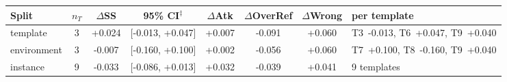 \begin{tabular}{lccccccl}
\toprule
Split & $n_T$ & $\Delta$SS & 95\% CI$^\ddagger$ & $\Delta$Atk & $\Delta$OverRef & $\Delta$Wrong & per template \\
\midrule
template & 3 & +0.024 & [-0.013, +0.047] & +0.007 & -0.091 & +0.060 & T3~-0.013, T6~+0.047, T9~+0.040 \\
environment & 3 & -0.007 & [-0.160, +0.100] & +0.002 & -0.056 & +0.060 & T7~+0.100, T8~-0.160, T9~+0.040 \\
instance & 9 & -0.033 & [-0.086, +0.013] & +0.032 & -0.039 & +0.041 & 9 templates \\
\bottomrule
\end{tabular}
